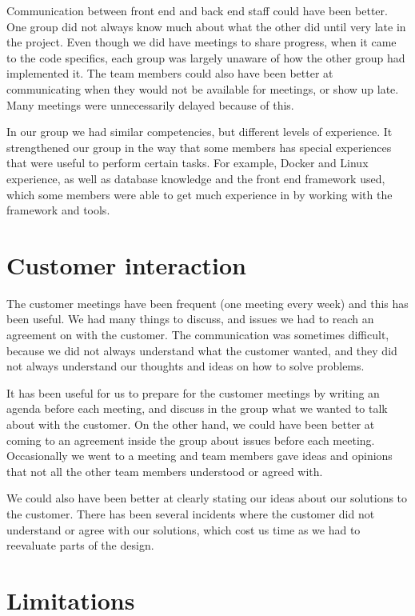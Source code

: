 Communication between front end and back end staff could have been better. One group did not always know much about what the other did until very late in the project. Even though we did have meetings to share progress, when it came to the code specifics, each group was largely unaware of how the other group had implemented it. The team members could also have been better at communicating when they would not be available for meetings, or show up late. Many meetings were unnecessarily delayed because of this.\newline

In our group we had similar competencies, but different levels of experience. It strengthened our group in the way that some members has special experiences that were useful to perform certain tasks. For example, Docker and Linux experience, as well as database knowledge and the front end framework used, which some members were able to get much experience in by working with the framework and tools.

\section{Customer interaction}

The customer meetings have been frequent (one meeting every week) and this has been useful. We had many things to discuss, and issues we had to reach an agreement on with the customer. The communication was sometimes difficult, because we did not always understand what the customer wanted, and they did not always understand our thoughts and ideas on how to solve problems.\newline

It has been useful for us to prepare for the customer meetings by writing an agenda before each meeting, and discuss in the group what we wanted to talk about with the customer. On the other hand, we could have been better at coming to an agreement inside the group about issues before each meeting. Occasionally we went to a meeting and team members gave ideas and opinions that not all the other team members understood or agreed with.\newline

We could also have been better at clearly stating our ideas about our solutions to the customer.  There has been several incidents where the customer did not understand or agree with our solutions, which cost us time as we had to reevaluate parts of the design.

\section{Limitations}

